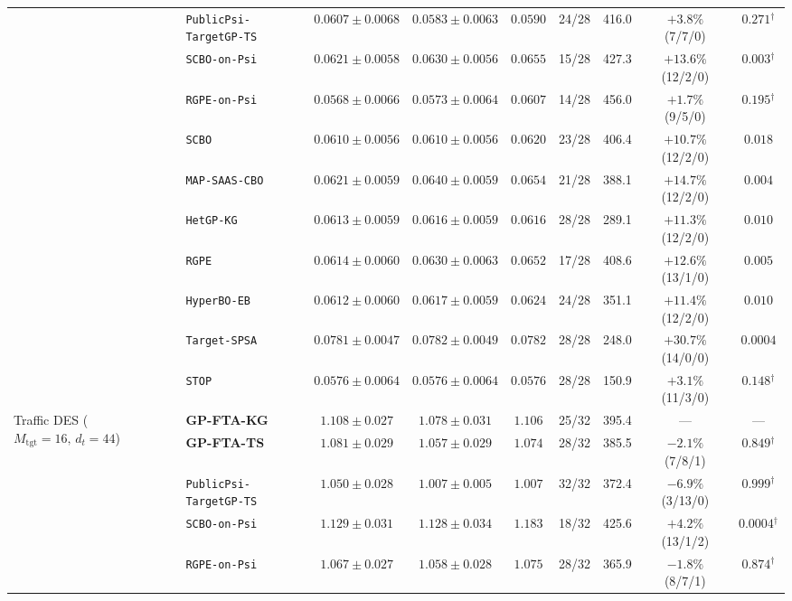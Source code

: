 \begin{table}[htbp]
{\begin{tabular}{llccccccc}
 & \texttt{PublicPsi-TargetGP-TS} & $0.0607 \pm 0.0068$ & $0.0583 \pm 0.0063$ & $0.0590$ & 24/28 & 416.0 & $+3.8\%$ (7/7/0) & $0.271{}^{\dagger}$ \\
 & \texttt{SCBO-on-Psi} & $0.0621 \pm 0.0058$ & $0.0630 \pm 0.0056$ & $0.0655$ & 15/28 & 427.3 & $+13.6\%$ (12/2/0) & $0.003{}^{\dagger}$ \\
 & \texttt{RGPE-on-Psi} & $0.0568 \pm 0.0066$ & $0.0573 \pm 0.0064$ & $0.0607$ & 14/28 & 456.0 & $+1.7\%$ (9/5/0) & $0.195{}^{\dagger}$ \\
 & \texttt{SCBO} & $0.0610 \pm 0.0056$ & $0.0610 \pm 0.0056$ & $0.0620$ & 23/28 & 406.4 & $+10.7\%$ (12/2/0) & $0.018$ \\
 & \texttt{MAP-SAAS-CBO} & $0.0621 \pm 0.0059$ & $0.0640 \pm 0.0059$ & $0.0654$ & 21/28 & 388.1 & $+14.7\%$ (12/2/0) & $0.004$ \\
 & \texttt{HetGP-KG} & $0.0613 \pm 0.0059$ & $0.0616 \pm 0.0059$ & $0.0616$ & 28/28 & 289.1 & $+11.3\%$ (12/2/0) & $0.010$ \\
 & \texttt{RGPE} & $0.0614 \pm 0.0060$ & $0.0630 \pm 0.0063$ & $0.0652$ & 17/28 & 408.6 & $+12.6\%$ (13/1/0) & $0.005$ \\
 & \texttt{HyperBO-EB} & $0.0612 \pm 0.0060$ & $0.0617 \pm 0.0059$ & $0.0624$ & 24/28 & 351.1 & $+11.4\%$ (12/2/0) & $0.010$ \\
 & \texttt{Target-SPSA} & $0.0781 \pm 0.0047$ & $0.0782 \pm 0.0049$ & $0.0782$ & 28/28 & 248.0 & $+30.7\%$ (14/0/0) & $0.0004$ \\
 & \texttt{STOP} & $0.0576 \pm 0.0064$ & $0.0576 \pm 0.0064$ & $0.0576$ & 28/28 & 150.9 & $+3.1\%$ (11/3/0) & $0.148{}^{\dagger}$ \\
\midrule
\multirow{12}{*}{Traffic DES ($M_{\mathrm{tgt}}\!=\!16,\, d_t\!=\!44$)} & \textbf{GP-FTA-KG} & $1.108 \pm 0.027$ & $1.078 \pm 0.031$ & $1.106$ & 25/32 & 395.4 & --- & --- \\
 & \textbf{GP-FTA-TS} & $1.081 \pm 0.029$ & $1.057 \pm 0.029$ & $1.074$ & 28/32 & 385.5 & $-2.1\%$ (7/8/1) & $0.849{}^{\dagger}$ \\
 & \texttt{PublicPsi-TargetGP-TS} & $1.050 \pm 0.028$ & $\mathbf{1.007 \pm 0.005}$ & $\mathbf{1.007}$ & 32/32 & 372.4 & $-6.9\%$ (3/13/0) & $0.999{}^{\dagger}$ \\
 & \texttt{SCBO-on-Psi} & $1.129 \pm 0.031$ & $1.128 \pm 0.034$ & $1.183$ & 18/32 & 425.6 & $+4.2\%$ (13/1/2) & $0.0004{}^{\dagger}$ \\
 & \texttt{RGPE-on-Psi} & $1.067 \pm 0.027$ & $1.058 \pm 0.028$ & $1.075$ & 28/32 & 365.9 & $-1.8\%$ (8/7/1) & $0.874{}^{\dagger}$ \\

\end{tabular}}
\end{table}
